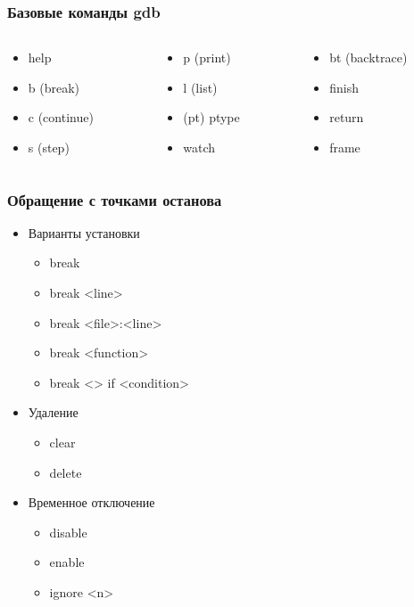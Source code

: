 \begin{frame}
  \frametitle{Базовые команды gdb}
  \begin{columns}
    \begin{column}{0.3\textwidth}
      \begin{itemize}
        \item help
        \item b (break)
        \item c (continue)
        \item s (step)
      \end{itemize}
    \end{column}
    
    \begin{column}{0.3\textwidth}
      \begin{itemize}
        \item p (print)
        \item l (list)
        \item (pt) ptype
        \item watch
      \end{itemize}
    \end{column}

    \begin{column}{0.3\textwidth}
      \begin{itemize}
        \item bt (backtrace)
        \item finish
        \item return
        \item frame
      \end{itemize}
    \end{column}
  \end{columns}
\end{frame}

\begin{frame}
 \frametitle{Обращение с точками останова}
 \begin{itemize}
   \item{Варианты установки}
    \begin{itemize}
     \item break
     \item break <line>
     \item break <file>:<line>
     \item break <function>
     \item break <> if <condition>
    \end{itemize}
    \item Удаление
     \begin{itemize}
       \item clear 
       \item delete
     \end{itemize}
     \item Временное отключение
     \begin{itemize}
       \item disable
       \item enable
       \item ignore <n>
     \end{itemize}
  \end{itemize}
\end{frame}

